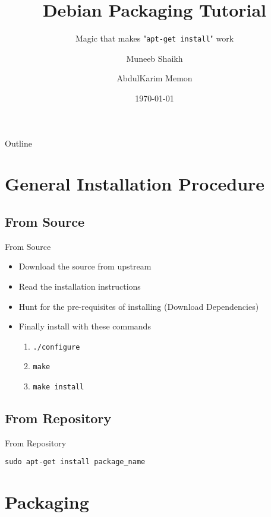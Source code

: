 \documentclass[red,10pt,a4paper]{beamer}
\title{Debian Packaging Tutorial}
\subtitle{Magic that makes "\texttt{apt-get install}" work}
\author[Muneeb, AbdulKarim]{Muneeb Shaikh \and AbdulKarim Memon}
\date{\today}
\begin{document}
\begin{frame}
    \titlepage
\end{frame}




\begin{frame}{Outline}
  \tableofcontents[pausesections] %
\end{frame}

\section{General Installation Procedure}
\subsection{From Source}

\begin{frame}{From Source}
	\begin{itemize}
		\item Download the source from upstream
			\br
		\item Read the installation instructions
			\br
		\item Hunt for the pre-requisites of installing (Download Dependencies)
			\br
		\item Finally install with these commands
			\begin{enumerate}
				\item \texttt{./configure}
					\hbr
				\item \texttt{make}
					\hbr
				\item \texttt{make install}
			\end{enumerate}
	\end{itemize}
\end{frame}

\subsection{From Repository}

\begin{frame}{From Repository}
\begin{center}

\large{\texttt{sudo apt-get install package\_name}}

\end{center}
\end{frame}

\section{Packaging}
\end{document}
